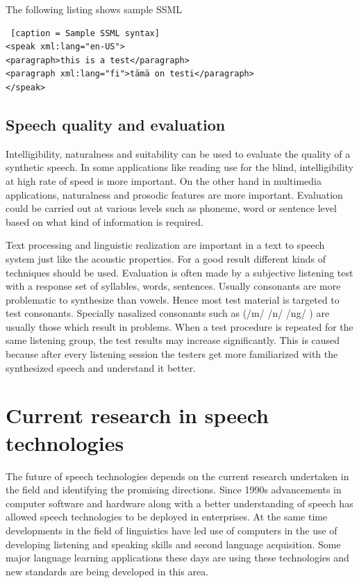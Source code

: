 \documentclass[11pt,a4paper,oneside,article]{memoir}
\begin{document}
The following listing shows sample SSML
\begin{lstlisting} [caption = Sample SSML syntax]
<speak xml:lang="en-US">
<paragraph>this is a test</paragraph>
<paragraph xml:lang="fi">tämä on testi</paragraph>
</speak>
\end{lstlisting}

\section{Speech quality and evaluation}
Intelligibility, naturalness and suitability can be used to evaluate the quality of a synthetic speech. In some applications like reading use for the blind, intelligibility at high rate of speed is more important. On the other hand in multimedia applications, naturalness and prosodic features are more important. Evaluation could be carried out at various levels such as phoneme, word or sentence level based on what kind of information is required.\cite{hut}

Text processing and linguistic realization are important in a text to speech system just like the acoustic properties. For a good result different kinds of techniques should be used. Evaluation is often made by a subjective listening test with a response set of syllables, words, sentences. Usually consonants are more problematic to synthesize than vowels. Hence most test material is targeted to test consonants. Specially nasalized consonants such as (/m/ /n/ /ng/ ) are usually those which result in problems. 
When a test procedure is repeated for the same listening group, the test results may increase significantly. This is caused because after every listening session the testers get more familiarized with the synthesized speech and understand it better.  \cite{hut}

 
\clearpage
\chapter{Current research in speech technologies}
The future of speech technologies depends on the current research undertaken in the field and identifying the promising directions.
Since 1990s advancements in computer software and hardware along with a better understanding of speech has allowed speech technologies to be deployed in enterprises. At the same time developments in the field of linguistics have led use of computers in the use of developing listening and speaking skills and second language acquisition. Some major language learning applications these days are using these technologies and new standards are being developed in this area.\cite{rob}
\end{document}
